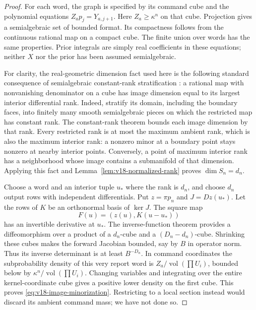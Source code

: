 \documentclass[11pt]{amsart}
\theoremstyle{definition}\newtheorem{definition}[theorem]{Definition}
\theoremstyle{remark}\newtheorem{remark}[theorem]{Remark}
\begin{document}
\begin{proof}
For each word, the graph is specified by its command cube and the
polynomial equations $Z_ap_j=Y_{a,j+1}$. Here
$Z_a\ge\kappa^n$ on that cube. Projection gives a semialgebraic set of
bounded format. Its compactness follows from the continuous rational
map on a compact cube. The finite union over words has the same
properties. Prior integrals are simply real coefficients in these
equations; neither $X$ nor the prior has been assumed semialgebraic.

For clarity, the real-geometric dimension fact used here is the
following standard consequence of semialgebraic constant-rank
stratification \cite{BochnakCosteRoy}: a rational map with nonvanishing
denominator on a cube has image dimension equal to its largest
interior differential rank. Indeed, stratify its domain, including the
boundary faces, into finitely many smooth semialgebraic pieces on which
the restricted map has constant rank. The constant-rank theorem bounds
each image dimension by that rank. Every restricted rank is at most
the maximum ambient rank, which is also the maximum interior rank:
a nonzero minor at a boundary point stays nonzero at nearby interior
points. Conversely, a point of maximum interior rank has a neighborhood
whose image contains a submanifold of that dimension. Applying this
fact and Lemma~\ref{lem:v18-normalized-rank} proves $\dim S_n=d_n$.

Choose a word and an interior tuple $u_*$ where the rank is $d_n$, and
choose $d_n$ output rows with independent differentials. Put $z=\pi p_n$
and $J=Dz(u_*)$. Let the rows of $K$ be an orthonormal basis of
$\ker J$. The square map
\[
 F(u)=(z(u),K(u-u_*))
\]
has an invertible derivative at $u_*$. The inverse-function theorem
provides a diffeomorphism over a product of a $d_n$-cube and a
$(D_n-d_n)$-cube. Shrinking these cubes makes the forward Jacobian
bounded, say by $B$ in operator norm. Thus its inverse determinant is
at least $B^{-D_n}$. In command coordinates the subprobability density
of this very report word is $Z_a/\operatorname{vol}(\prod U_i)$,
bounded below by $\kappa^n/\operatorname{vol}(\prod U_i)$.
Changing variables and integrating over the entire kernel-coordinate
cube gives a positive lower density on the first cube. This proves
\eqref{eq:v18-image-minorization}. Restricting to a local section instead
would discard its ambient command mass; we have not done so.
\end{proof}
\end{document}
